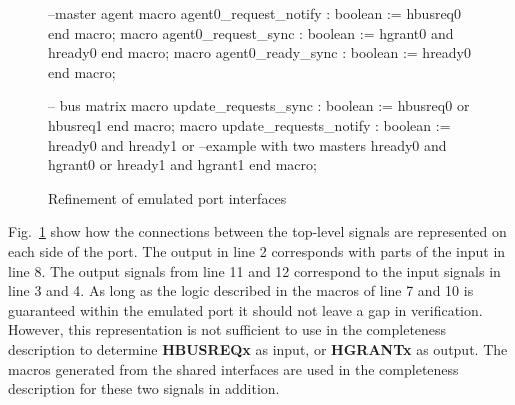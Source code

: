 \begin{figure}[h!]
\begin{VHI}
--master agent
macro agent0_request_notify : boolean := hbusreq0 end macro;
macro agent0_request_sync : boolean := hgrant0 and hready0 end macro;
macro agent0_ready_sync : boolean := hready0 end macro;

-- bus matrix
macro update_requests_sync : boolean := 
 hbusreq0 or hbusreq1 
end macro;
macro update_requests_notify : boolean :=
 hready0 and hready1 or --example with two masters
 hready0 and hgrant0 or
 hready1 and hgrant1
end macro;
\end{VHI}
\caption{Refinement of emulated port interfaces}
\label{fig:em-port-refine}
\end{figure}

Fig.~\ref{fig:em-port-refine} show how the connections between the top-level signals are represented on each side of the port. The output in line 2 corresponds with parts of the input in line 8. The output signals from line 11 and 12 correspond to the input signals in line 3 and 4. As long as the logic described in the macros of line 7 and 10 is guaranteed within the emulated port it should not leave a gap in verification. However, this representation is not sufficient to use in the completeness description to determine \textbf{HBUSREQx} as input, or \textbf{HGRANTx} as output. The macros generated from the shared interfaces are used in the completeness description for these two signals in addition. 
  

